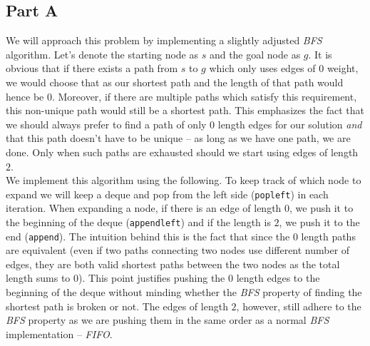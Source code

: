 \documentclass[12pt,twoside]{article}
\begin{document}

\begin{problems}

\section*{Part A}

\problem  %
We will approach this problem by implementing a slightly adjusted \emph{BFS} algorithm. Let's denote the starting node as $s$ and the goal node as $g$. It is obvious that if there exists a path from $s$ to $g$ which only uses edges of $0$ weight, we would choose that as our shortest path and the length of that path would hence be $0$. Moreover, if there are multiple paths which satisfy this requirement, this non-unique path would still be a shortest path. This emphasizes the fact that we should always prefer to find a path of only $0$ length edges for our solution \emph{and} that this path doesn't have to be unique -- as long as we have one path, we are done. Only when such paths are exhausted should we start using edges of length $2$.\\

We implement this algorithm using the following. To keep track of which node to expand we will keep a deque and pop from the left side ({\tt popleft}) in each iteration. When expanding a node, if there is an edge of length $0$, we push it to the beginning of the deque ({\tt appendleft}) and if the length is $2$, we push it to the end ({\tt append}). The intuition behind this is the fact that since the $0$ length paths are equivalent (even if two paths connecting two nodes use different number of edges, they are both valid shortest paths between the two nodes as the total length sums to $0$). This point justifies pushing the $0$ length edges to the beginning of the deque without minding whether the \emph{BFS} property of finding the shortest path is broken or not. The edges of length $2$, however, still adhere to the \emph{BFS} property as we are pushing them in the same order as a normal \emph{BFS} implementation -- \emph{FIFO}.\\


\end{problems}
\end{document}
